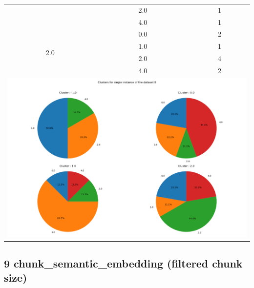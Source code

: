 \begin{longtable}{|c|c|c|c|c|}
& \multicolumn{2}{c|}{2.0} & \multicolumn{2}{c|}{1} \\
& \multicolumn{2}{c|}{4.0} & \multicolumn{2}{c|}{1} \\
\hline
\multirow{4}{*}{2.0} & \multicolumn{2}{c|}{0.0} & \multicolumn{2}{c|}{2} \\
& \multicolumn{2}{c|}{1.0} & \multicolumn{2}{c|}{1} \\
& \multicolumn{2}{c|}{2.0} & \multicolumn{2}{c|}{4} \\
& \multicolumn{2}{c|}{4.0} & \multicolumn{2}{c|}{2} \\
\hline
\multicolumn{5}{|c|}{\includegraphics[width=0.8\linewidth]{img/annexes/8/clustering_pie_charts/single instance.png}} \\
\end{longtable}


\subsection{9 chunk\_semantic\_embedding (filtered chunk size)}

